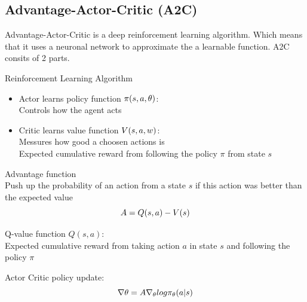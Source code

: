\subsection{Advantage-Actor-Critic (A2C)}

Advantage-Actor-Critic is a deep reinforcement learning algorithm. Which means that it uses a neuronal network to approximate the a learnable function. A2C consits of 2 parts. 

Reinforcement Learning Algorithm
\begin{itemize}

	\item Actor	learns policy function $\mathnormal{\pi(s, a, \theta)}$:\\
	Controls how the agent acts	
	\item Critic learns value function $\mathnormal{V(s, a, w)}$:\\
	Messures how good a choosen actions is\\
 	Expected cumulative reward from following the policy $\pi$ from state $s$	
\end{itemize}



Advantage function\\
		Push up the probability of an action from a state $s$ if this action was better than the expected value
		\begin{equation}
		\mathnormal{
		A = Q(s, a) - V(s)
		}
		\end{equation}

Q-value function $Q(s, a)$:\\ %
		Expected cumulative reward from taking action $a$ in state $s$ and following the policy $\pi$

Actor Critic policy update:
	\begin{equation}
		\mathnormal{
		\nabla \theta = A \nabla_\theta log \pi_\theta (a | s)}
	\end{equation}
